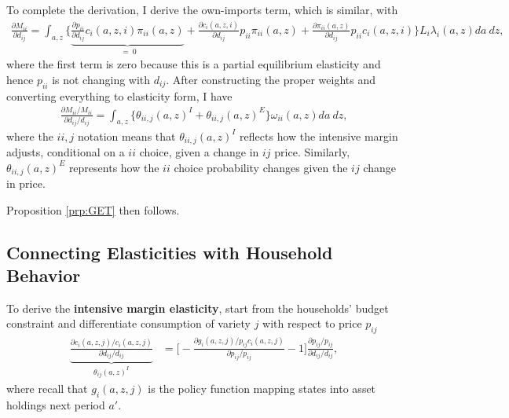 \documentclass[12pt,pdftex]{article}
\begin{document}
\begin{onehalfspacing}
To complete the derivation, I derive the own-imports term, which is similar, with
\begin{align}
\frac{\partial  M_{ii}}{\partial d_{ij}} = \int_{a,z} \bigg \{ \underbrace{\frac{\partial p_{ii}}{\partial d_{ij}} c_{i}(a,z,i) \pi_{ii}(a,z)}_{ \ = \ 0} +  \frac{\partial c_{i}(a,z,i)}{\partial d_{ij}} p_{ii} \pi_{ii}(a,z) + \frac{\partial \pi_{ii}(a,z)}{\partial d_{ij}} p_{ii}c_{i}(a,z,i) \bigg \} L_i \lambda_{i}(a,z)da \ dz,
\end{align}
where the first term is zero because this is a partial equilibrium elasticity and hence $p_{ii}$ is not changing with $d_{ij}$. After constructing the proper weights and converting everything to elasticity form, I have
\begin{align}
\frac{\partial  M_{ii} / M_{ii}}{\partial d_{ij} / d_{ij}} = \int_{a,z} \bigg \{ \theta_{ii,j}(a,z)^{I} + \theta_{ii,j}(a,z)^{E} \bigg \}\omega_{ii}(a,z)da \ dz,
\end{align}
where the $ii, j$ notation means that $\theta_{ii,j}(a,z)^{I}$ reflects how the intensive margin adjusts, conditional on a $ii$ choice, given a change in $ij$ price. Similarly, $\theta_{ii,j}(a,z)^{E}$ represents how the $ii$ choice probability changes given the $ij$ change in price.

Proposition \ref{prp:GET} then follows.

\subsection{Connecting Elasticities with Household Behavior}

To derive the \textbf{intensive margin elasticity}, start from the households' budget constraint and differentiate consumption of variety $j$ with respect to price $p_{ij}$
\begin{align}
\underbrace{\frac{\partial c_{i}(a,z,j)/ c_{i}(a,z,j)}{\partial d_{ij} / d_{ij}}}_{\theta_{ij}(a,z)^{I}} &= \bigg [-\frac{\partial g_{i}(a,z,j)/ p_{ij}c_{i}(a,z,j)}{\partial p_{ij}/ p_{ij}} - 1 \bigg ]\frac{\partial p_{ij}/p_{ij}}{\partial d_{ij}/ d_{ij}},
\label{eq:apx-intensive-margin}
\end{align}
where recall that $g_{i}(a,z,j)$ is the policy function mapping states into asset holdings next period $a'$.


\end{onehalfspacing}
\end{document}
